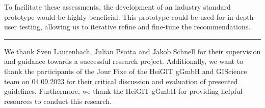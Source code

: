 \documentclass[agile, final]{copernicus-agile}
\begin{document}
To facilitate these assessments, the development of an industry standard prototype would be highly beneficial. This prototype could be used for in-depth user testing, allowing us to iterative refine and fine-tune the recommendations.


\vspace{1.5em}
\hrule


\vspace{-2.5em}


\vspace{-2.5em}


\vspace{-2.5em}

\begin{acknowledgements}
We thank Sven Lautenbach, Julian Psotta and Jakob Schnell for their supervision and guidance towards a successful research project. Additionally, we want to thank the participants of the Jour Fixe of the HeiGIT gGmbH and GIScience team on 04.09.2023 for their critical discussion and evaluation of presented guidelines. Furthermore, we thank the HeiGIT gGmbH for providing helpful resources to conduct this research.
\end{acknowledgements}




\end{document}
